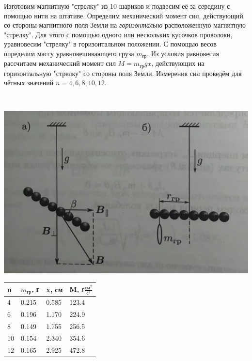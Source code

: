 \documentclass[a4paper,12pt]{article}
\begin{document}
\begin{minipage}{0.45\textwidth}

Изготовим магнитную "стрелку" из 10 шариков и подвесим её за середину с помощью нити на штативе.
Определим механический момент сил, действующий со стороны магнитного поля Земли на \textit{горизонтально} расположенную магнитную "стрелку". Для этого с помощью одного или нескольких кусочков проволоки, уравновесим "стрелку" в горизонтальном положении.
С помощью весов определим массу уравновешивающего груза $m_{гр}$.
Из условия равновесия рассчитаем механический момент сил $M = m_{гр}gx$, действующих на горизонтальную "стрелку"  со стороны поля Земли. Измерения сил проведём для чётных значений $n = 4,6,8,10,12$.
\end{minipage}
\begin{minipage}{0.05\textwidth}
\
\end{minipage}
\begin{minipage}{0.45\textwidth}
\begin{center}
\includegraphics[width=\linewidth]{4.jpg}\\
\end{center}
\end{minipage}

\begin{center}
\begin{tabular}{|l|l|l|l|}
		\hline
		n  & $m_{гр}$, г  & x, см & M, $г\frac{см^2}{с^2}$ \\
		\hline
		4  & 0.215 & 0.585 & 123.4  \\
		\hline
		6  & 0.196 & 1.170 & 224.9   \\
		 \hline
		8  & 0.149 & 1.755 & 256.5   \\
		\hline
		10 & 0.154 & 2.340 & 354.6   \\
		\hline
		12 & 0.165 & 2.925 & 472.8   \\
		\hline
\end{tabular}
\end{center}
\end{document}
